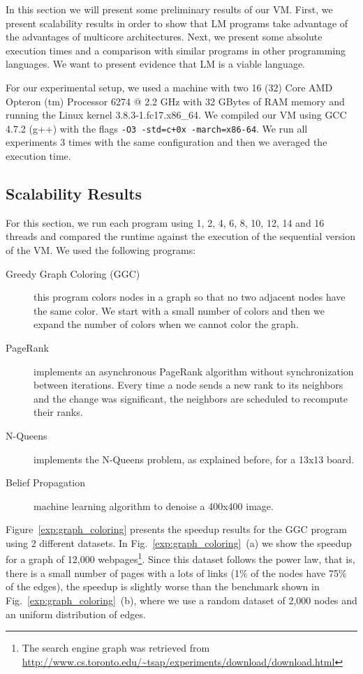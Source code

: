 In this section we will present some preliminary results of our VM.
First, we present scalability results in order to show that LM programs take advantage of the advantages of multicore architectures.
Next, we present some absolute execution times and a comparison with similar programs in other programming languages.
We want to present evidence that LM is a viable language.

For our experimental setup, we used a machine 
with two 16 (32) Core AMD Opteron
(tm) Processor 6274 $@$ 2.2 GHz with 32 GBytes of RAM memory and running the Linux
kernel 3.8.3-1.fc17.x86\_64.
     We compiled our VM using GCC 4.7.2 (g++) with the flags \texttt{-O3 -std=c+0x -march=x86-64}.
     We run all experiments 3 times with the same configuration and then we averaged the execution time.
     
\subsection{Scalability Results}

For this section, we run each program using 1, 2, 4, 6, 8, 10, 12, 14 and 16 threads and compared the runtime against the execution of the sequential version of the VM. We used the following programs:

\newcommand{\figsize}[0]{6.5cm}
\captionsetup[sub]{              %
       font=scriptsize}

\begin{description}
   \item[Greedy Graph Coloring (GGC)] this program colors nodes in a graph so that no two adjacent nodes have the same color. We start with a small number of colors and then we expand the number of colors when we cannot color the graph.
   \item[PageRank] implements an asynchronous PageRank algorithm without synchronization between iterations. Every time a node sends a new rank to its neighbors and the change was significant, the neighbors are scheduled to recompute their ranks.
   \item[N-Queens] implements the N-Queens problem, as explained before, for a 13x13 board.
   \item[Belief Propagation] machine learning algorithm to denoise a 400x400 image.
\end{description}

Figure~\ref{exp:graph_coloring} presents the speedup results for the GGC program using 2 different datasets. In Fig.~\ref{exp:graph_coloring}~(a) we show the speedup for a graph of 12,000 webpages\footnote{The search engine graph was retrieved from \url{http://www.cs.toronto.edu/~tsap/experiments/download/download.html}}. Since this dataset follows the power law, that is, there is a small number of pages with a lots of links (1\% of the nodes have 75\% of the edges), the speedup is slightly worse than the benchmark shown in Fig.~\ref{exp:graph_coloring}~(b), where we use a random dataset of 2,000 nodes and an uniform distribution of edges.

